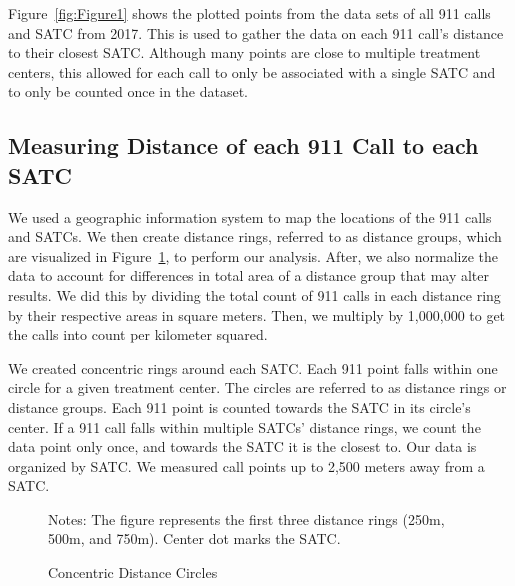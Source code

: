\documentclass[12pt]{article}
\begin{document}
Figure~\ref{fig:Figure1} shows the plotted points from the data sets of all 911 calls and SATC from 2017. This is used to gather the data on each 911 call's distance to their closest SATC. Although many points are close to multiple treatment centers, this allowed for each call to only be associated with a single SATC and to only be counted once in the dataset. 



\subsection{Measuring Distance of each 911 Call to each SATC}
 

 We used a geographic information system to map the locations of the 911 calls and SATCs. We then create distance rings, referred to as distance groups, which are visualized in Figure~\ref{fig:concentric_circles}, to perform our analysis. After, we also normalize the data to account for differences in total area of a distance group that may alter results. We did this by dividing the total count of 911 calls in each distance ring by their respective areas in square meters. Then, we multiply by 1,000,000 to get the calls into count per kilometer squared.

We created concentric rings around each SATC. Each 911 point falls within one circle for a given treatment center.  The circles are referred to as distance rings or distance groups. Each 911 point is counted towards the SATC in its circle's center. If a 911 call falls within multiple SATCs' distance rings, we count the data point only once, and towards the SATC it is the closest to. Our data is organized by SATC. We measured call points up to 2,500 meters away from a SATC.  

\begin{figure}[ht]  
    \centering 


    \vspace{0.5em}  
    
    \caption{Concentric Distance Circles} 
    \label{fig:concentric_circles} 
    {\small Notes: The figure represents the first three distance rings (250m, 500m, and 750m). Center dot marks the SATC.}
\end{figure}
\end{document}
